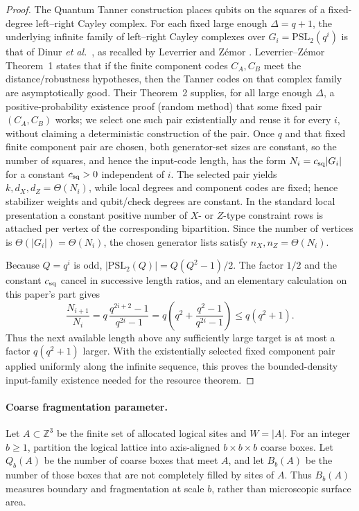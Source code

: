 \documentclass[aps,prx,reprint,superscriptaddress,nofootinbib,floatfix,longbibliography]{revtex4-2}
\theoremstyle{definition}
\begin{document}
\begin{proof}
The Quantum Tanner construction places qubits on the squares of a fixed-degree
left--right Cayley complex.  For each fixed large enough $\Delta=q+1$, the
underlying infinite family of left--right Cayley complexes over
$G_i=\mathrm{PSL}_2(q^i)$ is that of Dinur \emph{et al.}\ \cite{DinurLTC}, as
recalled by Leverrier and Z\'emor \cite{LeverrierZemorTanner}.  Leverrier--Z\'emor
Theorem~1 states that if the finite component codes $C_A,C_B$ meet the
distance/robustness hypotheses, then the Tanner codes on that complex family
are asymptotically good.  Their Theorem~2 supplies, for all large enough
$\Delta$, a positive-probability existence proof (random method) that some
fixed pair $(C_A,C_B)$ works; we select one such pair existentially and reuse
it for every $i$, without claiming a deterministic construction of the pair.
Once $q$ and that fixed finite component pair are chosen, both generator-set
sizes are constant, so the number of squares, and hence the input-code length,
has the form $N_i=c_{\rm sq}|G_i|$ for a constant $c_{\rm sq}>0$ independent of
$i$.  The selected pair yields $k,d_X,d_Z=\Theta(N_i)$, while local degrees and
component codes are fixed; hence stabilizer weights and qubit/check degrees are
constant.  In the standard local presentation a constant positive number of
$X$- or $Z$-type constraint rows is attached per vertex of the corresponding
bipartition.  Since the number of vertices is $\Theta(|G_i|)=\Theta(N_i)$, the
chosen generator lists satisfy $n_X,n_Z=\Theta(N_i)$.

Because $Q=q^i$ is odd,
$|\mathrm{PSL}_2(Q)|=Q(Q^2-1)/2$.  The factor $1/2$ and the constant
$c_{\rm sq}$ cancel in successive length ratios, and an elementary calculation
on this paper's part gives
\begin{equation}
 \frac{N_{i+1}}{N_i}
 =q\,\frac{q^{2i+2}-1}{q^{2i}-1}
 =q\left(q^2+\frac{q^2-1}{q^{2i}-1}\right)
 \le q(q^2+1).                                                       \tag{A24a}
\end{equation}
Thus the next available length above any sufficiently large target is at most
a factor $q(q^2+1)$ larger.  With the existentially selected fixed component
pair applied uniformly along the infinite sequence, this proves the
bounded-density input-family existence needed for the resource theorem.
\end{proof}

\paragraph{Coarse fragmentation parameter.}
Let $A\subset\mathbb Z^3$ be the finite set of allocated logical sites and
$W=|A|$.  For an integer $b\ge1$, partition the logical lattice into
axis-aligned $b\times b\times b$ coarse boxes.  Let $Q_b(A)$ be the number of
coarse boxes that meet $A$, and let $B_b(A)$ be the number of those boxes that
are not completely filled by sites of $A$.  Thus $B_b(A)$ measures boundary
and fragmentation at scale $b$, rather than microscopic surface area.
\end{document}
